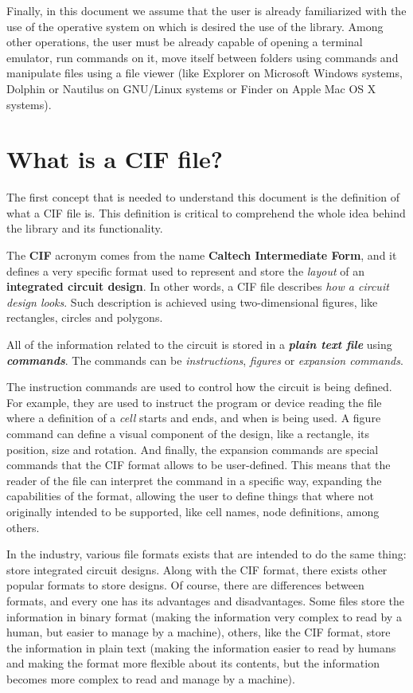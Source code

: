 \documentclass[11pt,twoside,openany,x11names,svgnames]{memoir}
\begin{document}
Finally, in this document we assume that the user is already familiarized with the use of the operative system on which is desired the use of the library. Among other operations, the user must be already capable of opening a terminal emulator, run commands on it, move itself between folders using commands and manipulate files using a file viewer (like Explorer on Microsoft Windows systems, Dolphin or Nautilus on GNU/Linux systems or Finder on Apple Mac OS X systems).

\section{What is a CIF file?}\label{What-is-a-CIF-file}

The first concept that is needed to understand this document is the definition of what a CIF file is. This definition is critical to comprehend the whole idea behind the library and its functionality.

The \textbf{CIF} acronym comes from the name \textbf{Caltech Intermediate Form}, and it defines a very specific format used to represent and store the \textit{layout} of an \textbf{integrated circuit design}. In other words, a CIF file describes \textit{how a circuit design looks}. Such description is achieved using two-dimensional figures, like rectangles, circles and polygons.

All of the information related to the circuit is stored in a \textit{\textbf{plain text file}} using \textit{\textbf{commands}}. The commands can be \textit{instructions}, \textit{figures} or \textit{expansion commands}.

The instruction commands are used to control how the circuit is being defined. For example, they are used to instruct the program or device reading the file where a definition of a \textit{cell} starts and ends, and when is being used. A figure command can define a visual component of the design, like a rectangle, its position, size and rotation. And finally, the expansion commands are special commands that the CIF format allows to be user-defined. This means that the reader of the file can interpret the command in a specific way, expanding the capabilities of the format, allowing the user to define things that where not originally intended to be supported, like cell names, node definitions, among others.

In the industry, various file formats exists that are intended to do the same thing: store integrated circuit designs. Along with the CIF format, there exists other popular formats to store designs. Of course, there are differences between formats, and every one has its advantages and disadvantages. Some files store the information in binary format (making the information very complex to read by a human, but easier to manage by a machine), others, like the CIF format, store the information in plain text (making the information easier to read by humans and making the format more flexible about its contents, but the information becomes more complex to read and manage by a machine).
\end{document}
